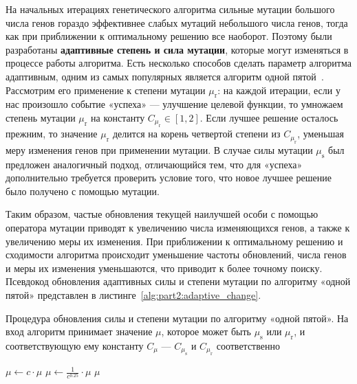 \FloatBarrier

На начальных итерациях генетического алгоритма сильные мутации большого числа генов гораздо эффективнее слабых мутаций небольшого числа генов, тогда как при приближении к оптимальному решению все наоборот.
Поэтому были разработаны \textbf{адаптивные степень и сила мутации}, которые могут изменяться в процессе работы алгоритма.
Есть несколько способов сделать параметр алгоритма адаптивным, одним из самых популярных является алгоритм одной пятой~\cite{schumer1968adaptive}.
Рассмотрим его применение к степени мутации $\mu_\text{r}$: на каждой итерации, если у нас произошло событие «успеха» --- улучшение целевой функции, то умножаем степень мутации $\mu_\text{r}$ на константу $C_{\mu_\text{r}}\in[1,2]$.
Если лучшее решение осталось прежним, то значение $\mu_\text{r}$ делится на корень четвертой степени из $C_{\mu_\text{r}}$, уменьшая меру изменения генов при применении мутации.
В случае силы мутации $\mu_\text{s}$ был предложен аналогичный подход, отличающийся тем, что для «успеха» дополнительно требуется проверить условие того, что новое лучшее решение было получено с помощью мутации.

Таким образом, частые обновления текущей наилучшей особи с помощью оператора мутации приводят к увеличению числа изменяющихся генов, а также к увеличению меры их изменения.
При приближении к оптимальному решению и сходимости алгоритма происходит уменьшение частоты обновлений, числа генов и меры их изменения уменьшаются, что приводит к более точному поиску.
Псевдокод обновления адаптивных силы и степени мутации по алгоритму «одной пятой» представлен в листинге~\ref{alg:part2:adaptive_change}.

\begin{algorithm}
\caption{Процедура обновления силы и степени мутации по алгоритму «одной пятой». На вход алгоритм принимает значение $\mu$, которое может быть $\mu_\text{s}$ или $\mu_\text{r}$, и соответствующую ему константу $C_\mu$ --- $C_{\mu_\text{s}}$ и $C_{\mu_\text{r}}$ соответственно}
\label{alg:part2:adaptive_change}
\begin{algorithmic}[1]
 
    \State $\mu \leftarrow c \cdot \mu$
\Else
    \State $\mu \leftarrow \frac{1}{c^{0.25}} \cdot \mu$
\EndIf
\Return $\mu$
\EndFunction
\end{algorithmic}
\end{algorithm}

